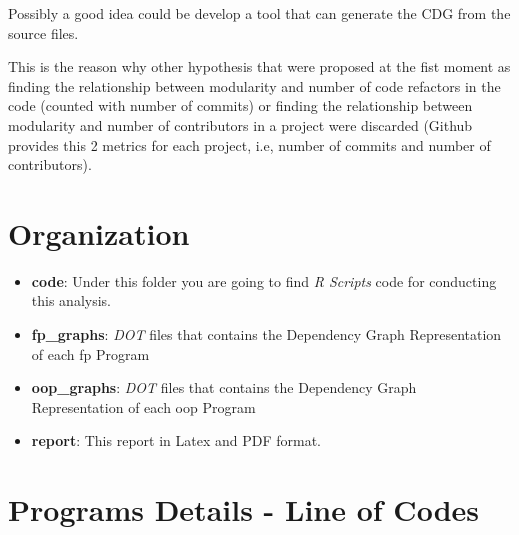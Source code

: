 \documentclass[12pt, a4paper]{article}
\begin{document}
Possibly a good idea could be develop a tool that can generate the CDG from the source files.

This is the reason why other hypothesis that were proposed at the fist moment as finding the relationship between modularity and number of code refactors in the code (counted with number of commits) or finding the relationship between modularity and number of contributors in a project were discarded (Github provides this 2 metrics for each project, i.e, number of commits and number of contributors).




\appendix
\section{Organization}\label{apx:sec:org:1}

\begin{itemize}
    \item \textbf{code}: Under this folder you are going to find \textit{R Scripts} code for conducting this analysis.
    \item \textbf{fp\_graphs}: \textit{DOT} files that contains the Dependency Graph Representation of each \acrlong{fp} Program
    \item \textbf{oop\_graphs}: \textit{DOT} files that contains the Dependency Graph Representation of each \acrlong{oop} Program
    \item \textbf{report}: This report in Latex and PDF format.
\end{itemize}

\section{Programs Details - Line of Codes}\label{apx:sec:loc}
\end{document}
